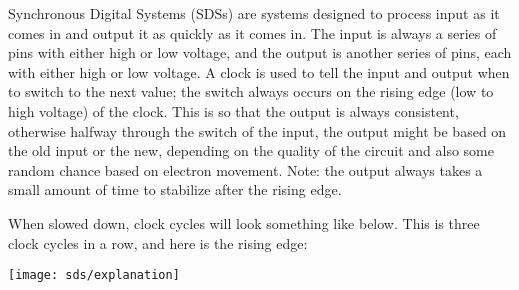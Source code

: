 \begin{blocksection}
\question
Synchronous Digital Systems (SDSs) are systems designed to process input as it comes in and output it as quickly as it comes in.  The input is always a series of pins with either high or low voltage, and the output is another series of pins, each with either high or low voltage.  A clock is used to tell the input and output when to switch to the next value; the switch always occurs on the rising edge (low to high voltage) of the clock.  This is so that the output is always consistent, otherwise halfway through the switch of the input, the output might be based on the old input or the new, depending on the quality of the circuit and also some random chance based on electron movement.  Note: the output always takes a small amount of time to stabilize after the rising edge.

When slowed down, clock cycles will look something like below.  This is three clock cycles in a row, and here is the rising edge:

\texttt{[image: sds/explanation]}

\end{blocksection}